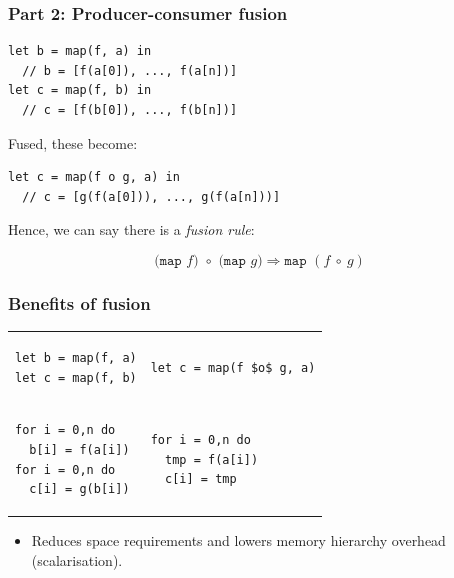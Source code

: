 \documentclass[rgb,dvipsnames]{beamer}
\begin{document}
\begin{frame}[fragile]
  \frametitle{Part 2: Producer-consumer fusion}

\begin{lstlisting}
let b = map(f, a) in
  // b = [f(a[0]), ..., f(a[n])]
let c = map(f, b) in
  // c = [f(b[0]), ..., f(b[n])]
\end{lstlisting}

Fused, these become:

\begin{lstlisting}
let c = map(f o g, a) in
  // c = [g(f(a[0])), ..., g(f(a[n]))]
\end{lstlisting}

Hence, we can say there is a \textit{fusion rule}:

\[
\texttt{(map~$f$)~$\circ$~(map~$g$)} \Rightarrow \texttt{map~$(f~\circ~g)$}
\]

\end{frame}

\begin{frame}[fragile]
  \frametitle{Benefits of fusion}

  \begin{tabular}{p{}|p{}}
\begin{lstlisting}
let b = map(f, a)
let c = map(f, b)
\end{lstlisting}
    &
\begin{lstlisting}[mathescape]
let c = map(f $o$ g, a)
\end{lstlisting}
\\
\begin{lstlisting}
for i = 0,n do
  b[i] = f(a[i])
for i = 0,n do
  c[i] = g(b[i])
\end{lstlisting}
&
\begin{lstlisting}
for i = 0,n do
  tmp = f(a[i])
  c[i] = tmp
\end{lstlisting}
\end{tabular}

  \begin{itemize}
  \item Reduces space requirements and lowers memory hierarchy
    overhead (scalarisation).
  \end{itemize}
\end{frame}
\end{document}
